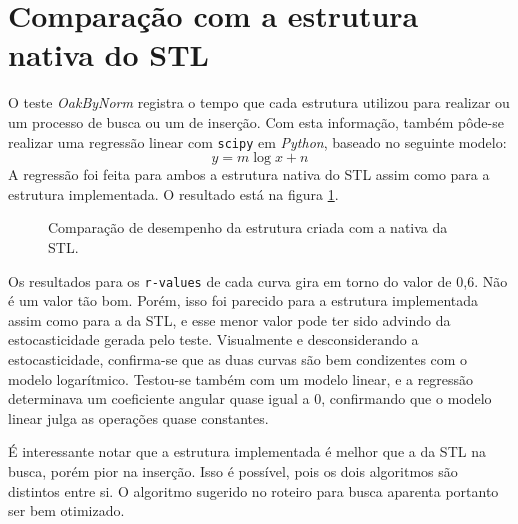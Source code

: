 \documentclass{article}[twocolumn]
\begin{document}
	\section{Compara\c{c}\~ao com a estrutura nativa do STL}
	O teste \textit{OakByNorm} registra o tempo que cada estrutura utilizou para realizar
	ou um processo de busca ou um de inser\c{c}\~ao. Com esta informa\c{c}\~ao, tamb\'em p\^ode-se
	realizar uma regress\~ao linear com \texttt{scipy} em \textit{Python}, baseado no seguinte
	modelo:
	\begin{equation}
		y = m \log{x} + n
		\nonumber
	\end{equation}
	A regress\~ao foi feita para ambos a estrutura nativa do STL assim como para a estrutura
	implementada. O resultado est\'a na figura \ref{fig:comp_stl}.
	\begin{figure}[H]
		\centering
		\caption{Compara\c{c}\~ao de desempenho da estrutura criada com a nativa da STL.}
		\label{fig:comp_stl}
	\end{figure}
	Os resultados para os \texttt{r-values} de cada curva gira em torno do valor de 0,6. N\~ao \'e
	um valor t\~ao bom. Por\'em, isso foi parecido para a estrutura implementada assim
	como para a da STL, e esse menor valor pode ter sido advindo da estocasticidade gerada
	pelo teste. Visualmente e desconsiderando a estocasticidade, confirma-se que as duas curvas
	s\~ao bem condizentes com o modelo logar\'itmico. Testou-se tamb\'em com um modelo linear, e
	a regress\~ao determinava um coeficiente angular quase igual a 0, confirmando que o modelo linear
	julga as opera\c{c}\~oes quase constantes.

	\'E interessante notar que a estrutura implementada \'e melhor que a da STL na busca, por\'em
	pior na inser\c{c}\~ao. Isso \'e poss\'ivel, pois os dois algoritmos s\~ao distintos entre si.
	O algoritmo sugerido no roteiro para busca aparenta portanto ser bem otimizado.
\end{document}
